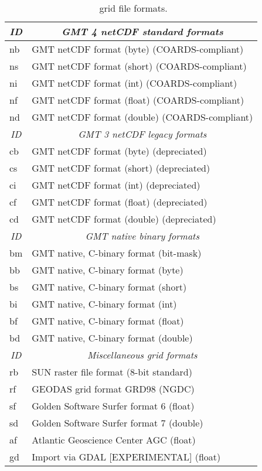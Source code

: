 \begin{table}[H]
\centering
\begin{tabular}{|l|l|} \hline
\multicolumn{1}{|c|}{\emph{ID}}	&	\multicolumn{1}{c|}{\emph{GMT 4 netCDF standard formats}} \\ \hline \hline
nb & GMT netCDF format (byte)   (COARDS-compliant)		\\ \hline
ns & GMT netCDF format (short)  (COARDS-compliant)		\\ \hline
ni & GMT netCDF format (int)    (COARDS-compliant)		\\ \hline
nf & GMT netCDF format (float)  (COARDS-compliant)		\\ \hline
nd & GMT netCDF format (double) (COARDS-compliant) 		\\ \hline \hline
\multicolumn{1}{|c|}{\emph{ID}}	&	\multicolumn{1}{c|}{\emph{GMT 3 netCDF legacy formats}} \\ \hline \hline
cb & GMT netCDF format (byte)	(depreciated) \\ \hline
cs & GMT netCDF format (short)	(depreciated) \\ \hline
ci & GMT netCDF format (int)	(depreciated) \\ \hline
cf & GMT netCDF format (float)	(depreciated) \\ \hline
cd & GMT netCDF format (double)	(depreciated) \\ \hline \hline
\multicolumn{1}{|c|}{\emph{ID}}	&	\multicolumn{1}{c|}{\emph{GMT native binary formats}} \\ \hline \hline
bm & GMT native, C-binary format (bit-mask)	\\ \hline
bb & GMT native, C-binary format (byte)		\\ \hline
bs & GMT native, C-binary format (short)	\\ \hline
bi & GMT native, C-binary format (int)		\\ \hline
bf & GMT native, C-binary format (float)	\\ \hline
bd & GMT native, C-binary format (double)	\\ \hline \hline
\multicolumn{1}{|c|}{\emph{ID}}	&	\multicolumn{1}{c|}{\emph{Miscellaneous grid formats}} \\ \hline \hline
rb & SUN raster file format (8-bit standard)	\\ \hline
rf & GEODAS grid format GRD98 (NGDC)		\\ \hline
sf & Golden Software Surfer format 6 (float)	\\ \hline
sd & Golden Software Surfer format 7 (double)	\\ \hline
af & Atlantic Geoscience Center AGC (float)	\\ \hline
gd & Import via GDAL [EXPERIMENTAL] (float)	\\ \hline
\end{tabular}
\caption{\gmt\ grid file formats.}
\label{tbl:grdformats}
\end{table}

